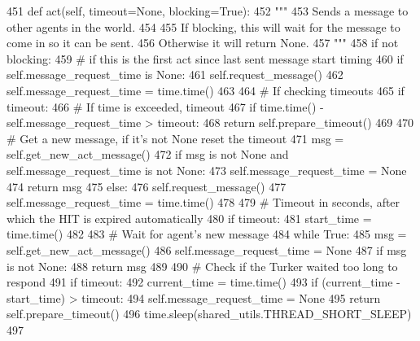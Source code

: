 \begin{DoxyCode}
451     \textcolor{keyword}{def }act(self, timeout=None, blocking=True):
452         \textcolor{stringliteral}{"""}
453 \textcolor{stringliteral}{        Sends a message to other agents in the world.}
454 \textcolor{stringliteral}{}
455 \textcolor{stringliteral}{        If blocking, this will wait for the message to come in so it can be sent.}
456 \textcolor{stringliteral}{        Otherwise it will return None.}
457 \textcolor{stringliteral}{        """}
458         \textcolor{keywordflow}{if} \textcolor{keywordflow}{not} blocking:
459             \textcolor{comment}{# if this is the first act since last sent message start timing}
460             \textcolor{keywordflow}{if} self.message\_request\_time \textcolor{keywordflow}{is} \textcolor{keywordtype}{None}:
461                 self.request\_message()
462                 self.message\_request\_time = time.time()
463 
464             \textcolor{comment}{# If checking timeouts}
465             \textcolor{keywordflow}{if} timeout:
466                 \textcolor{comment}{# If time is exceeded, timeout}
467                 \textcolor{keywordflow}{if} time.time() - self.message\_request\_time > timeout:
468                     \textcolor{keywordflow}{return} self.prepare\_timeout()
469 
470             \textcolor{comment}{# Get a new message, if it's not None reset the timeout}
471             msg = self.get\_new\_act\_message()
472             \textcolor{keywordflow}{if} msg \textcolor{keywordflow}{is} \textcolor{keywordflow}{not} \textcolor{keywordtype}{None} \textcolor{keywordflow}{and} self.message\_request\_time \textcolor{keywordflow}{is} \textcolor{keywordflow}{not} \textcolor{keywordtype}{None}:
473                 self.message\_request\_time = \textcolor{keywordtype}{None}
474             \textcolor{keywordflow}{return} msg
475         \textcolor{keywordflow}{else}:
476             self.request\_message()
477             self.message\_request\_time = time.time()
478 
479             \textcolor{comment}{# Timeout in seconds, after which the HIT is expired automatically}
480             \textcolor{keywordflow}{if} timeout:
481                 start\_time = time.time()
482 
483             \textcolor{comment}{# Wait for agent's new message}
484             \textcolor{keywordflow}{while} \textcolor{keyword}{True}:
485                 msg = self.get\_new\_act\_message()
486                 self.message\_request\_time = \textcolor{keywordtype}{None}
487                 \textcolor{keywordflow}{if} msg \textcolor{keywordflow}{is} \textcolor{keywordflow}{not} \textcolor{keywordtype}{None}:
488                     \textcolor{keywordflow}{return} msg
489 
490                 \textcolor{comment}{# Check if the Turker waited too long to respond}
491                 \textcolor{keywordflow}{if} timeout:
492                     current\_time = time.time()
493                     \textcolor{keywordflow}{if} (current\_time - start\_time) > timeout:
494                         self.message\_request\_time = \textcolor{keywordtype}{None}
495                         \textcolor{keywordflow}{return} self.prepare\_timeout()
496                 time.sleep(shared\_utils.THREAD\_SHORT\_SLEEP)
497 
\end{DoxyCode}
